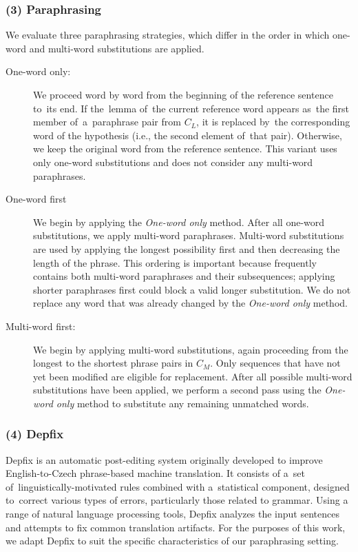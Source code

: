 \subsubsection{(3) Paraphrasing}
\label{paraphrasing}
We evaluate three paraphrasing strategies, which differ in the order in which one-word and multi-word substitutions are applied.

\begin{description}
\item[One-word only:] 
We proceed word by word from the beginning of the reference sentence to~its end. If the~lemma of~the current reference word appears as~the first member of~a~paraphrase pair from $ C_{L} $, it is replaced by~the corresponding word of the hypothesis (i.e., the second element of~that pair). Otherwise, we keep the original word from the reference sentence. This variant uses only one-word substitutions and does not consider any multi-word paraphrases.

\item[One-word first] 
We begin by applying the \textit{One-word only} method. After all one-word substitutions, we apply multi-word paraphrases. Multi-word substitutions are used by applying the longest possibility first and then decreasing the length of the phrase. This ordering is important because \cmpt frequently contains both multi-word paraphrases and their subsequences; applying shorter paraphrases first could block a valid longer substitution. We do not replace any word that was already changed by the \textit{One-word only} method. 

\item[Multi-word first:] 
We begin by applying multi-word substitutions, again proceeding from the longest to the shortest phrase pairs in $C_{M}$. Only sequences that have not yet been modified are eligible for replacement. After all possible multi-word substitutions have been applied, we perform a second pass using the \textit{One-word only} method to substitute any remaining unmatched words.
\end{description}


\subsubsection{(4) Depfix}
\label{depfix}
Depfix \citep{depfix} is an automatic post-editing system originally developed to improve English-to-Czech phrase-based machine translation. It consists of a~set of~linguistically-motivated rules combined with a~statistical component, designed to~correct various types of errors, particularly those related to grammar. Using a range of natural language processing tools, Depfix analyzes the input sentences and attempts to fix common translation artifacts. For the purposes of this work, we adapt Depfix to suit the specific characteristics of our paraphrasing setting.


